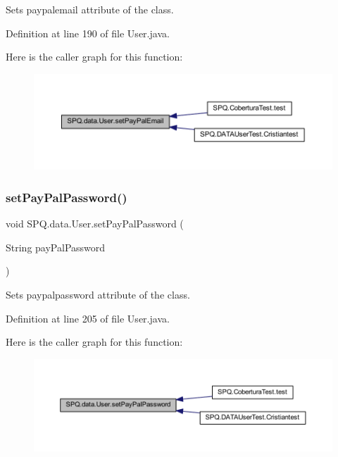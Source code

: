 Sets paypalemail attribute of the class. 

Definition at line 190 of file User.\+java.

Here is the caller graph for this function\+:\nopagebreak
\begin{figure}[H]
\begin{center}
\leavevmode
\includegraphics[width=350pt]{class_s_p_q_1_1data_1_1_user_abe8156eec92d2d94d290b96af8e8ea94_icgraph}
\end{center}
\end{figure}
\mbox{\label{class_s_p_q_1_1data_1_1_user_a61ca04ab3f3c854aa272f3097b355eb9}} 
\subsubsection{\texorpdfstring{set\+Pay\+Pal\+Password()}{setPayPalPassword()}}
{\footnotesize\ttfamily void S\+P\+Q.\+data.\+User.\+set\+Pay\+Pal\+Password (\begin{DoxyParamCaption}\item[{String}]{pay\+Pal\+Password }\end{DoxyParamCaption})}

Sets paypalpassword attribute of the class. 

Definition at line 205 of file User.\+java.

Here is the caller graph for this function\+:\nopagebreak
\begin{figure}[H]
\begin{center}
\leavevmode
\includegraphics[width=350pt]{class_s_p_q_1_1data_1_1_user_a61ca04ab3f3c854aa272f3097b355eb9_icgraph}
\end{center}
\end{figure}
\mbox{\label{class_s_p_q_1_1data_1_1_user_a6519805f5204c8d1add91a917634f588}} 
